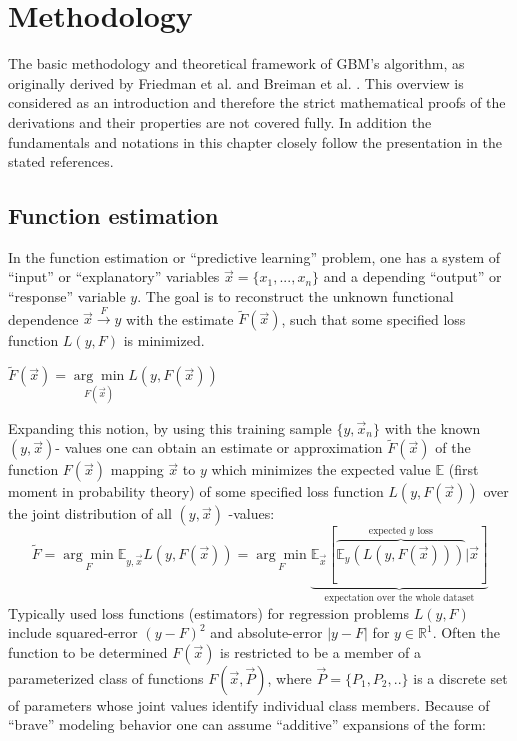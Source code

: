 \documentclass[12pt, a4paper]{article}
\begin{document}
\newpage
\section{Methodology}
The basic methodology and theoretical framework of GBM's algorithm, as originally derived by Friedman et al. \cite{Friedman2001} and Breiman et al. \cite{Breiman1984}. This overview is considered as an introduction and therefore the strict mathematical proofs of the derivations and their properties are not covered fully. In addition the fundamentals and notations in this chapter closely follow the presentation in the stated references.
\subsection{Function estimation}
In the function estimation or ``predictive learning'' problem, one has a system of ``input'' or ``explanatory'' variables $\vec{x} = \{x_1,...,x_n\}$ and a depending ``output'' or ``response'' variable $y$. The goal is to reconstruct the unknown functional dependence $\vec{x} \xrightarrow{F} y$ with the estimate $\tilde{F}(\vec{x})$, such that some specified loss function $L(y,F)$ is minimized.
\begin{center}
    $\tilde{F}(\vec{x}) = \underset{F(\vec{x})}{\arg\min} L(y,F(\vec{x}))$
\end{center}
Expanding this notion, by using this training sample $\{y,\vec{x}_n\}$ with the known $(y,\vec{x})$- values one can obtain an estimate or approximation $\tilde{F}(\vec{x})$ of the function $F(\vec{x})$ mapping $\vec{x}$ to $y$ which minimizes the expected value $\mathbb{E}$ (first moment in probability theory) of some specified loss function $L(y,F(\vec{x}))$ over the joint distribution of all $(y,\vec{x})$ -values:
\begin{equation}
    \tilde{F} = \underset{F}{\arg\min} \mathbb{E}_{y,\vec{x}} L(y,F(\vec{x})) = \underset{F}{\arg\min} \underbrace{\mathbb{E}_{\vec{x}} [\overbrace{\mathbb{E}_y (L(y,F(\vec{x})))}^\text{expected $y$ loss}|\vec{x}]}_\text{expectation over the whole dataset}
\end{equation}
Typically used loss functions (estimators) for regression problems $L(y,F)$ include squared-error $(y - F)^2$ and absolute-error $|y - F|$ for $y \in \mathbb{R}^1$.
Often the function to be determined $F(\vec{x})$ is restricted to be a member of a parameterized class of functions $F(\vec{x},\vec{P})$, where $\vec{P} = \{P_1,P_2,..\}$ is a discrete set of parameters whose joint values identify individual class members. Because of ``brave'' modeling behavior one can assume ``additive'' expansions of the form:
\end{document}
